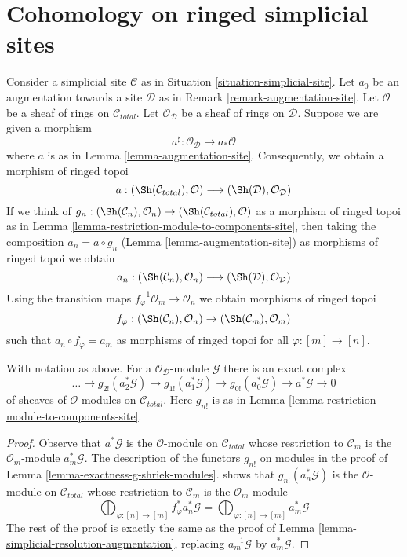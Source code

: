\section{Cohomology on ringed simplicial sites}
\label{section-cohomology-simplicial-sites-modules}

\noindent
Consider a simplicial site $\mathcal{C}$ as in
Situation \ref{situation-simplicial-site}.
Let $a_0$ be an augmentation towards a site $\mathcal{D}$ as in
Remark \ref{remark-augmentation-site}.
Let $\mathcal{O}$ be a sheaf of rings on $\mathcal{C}_{total}$.
Let $\mathcal{O}_\mathcal{D}$ be a sheaf of rings on $\mathcal{D}$.
Suppose we are given a morphism
$$
a^\sharp : \mathcal{O}_\mathcal{D} \longrightarrow a_*\mathcal{O}
$$
where $a$ is as in Lemma \ref{lemma-augmentation-site}.
Consequently, we obtain a morphism of ringed topoi
$$
a :
(\Sh(\mathcal{C}_{total}), \mathcal{O})
\longrightarrow
(\Sh(\mathcal{D}), \mathcal{O}_\mathcal{D})
$$
If we think of $g_n : (\Sh(\mathcal{C}_n), \mathcal{O}_n) \to
(\Sh(\mathcal{C}_{total}), \mathcal{O})$ as a morphism of ringed topoi
as in
Lemma \ref{lemma-restriction-module-to-components-site}, then
taking the composition $a_n = a \circ g_n$
(Lemma \ref{lemma-augmentation-site})
as morphisms of ringed topoi we obtain
$$
a_n :
(\Sh(\mathcal{C}_n), \mathcal{O}_n)
\longrightarrow
(\Sh(\mathcal{D}), \mathcal{O}_\mathcal{D})
$$
Using the transition maps $f_\varphi^{-1}\mathcal{O}_m \to \mathcal{O}_n$
we obtain morphisms of ringed topoi
$$
f_\varphi : (\Sh(\mathcal{C}_n), \mathcal{O}_n) \to
(\Sh(\mathcal{C}_m), \mathcal{O}_m)
$$
such that $a_n \circ f_\varphi = a_m$ as morphisms of
ringed topoi for all $\varphi : [m] \to [n]$.

\begin{lemma}
\label{lemma-simplicial-resolution-augmentation-modules}
With notation as above. For a $\mathcal{O}_\mathcal{D}$-module $\mathcal{G}$
there is an exact complex
$$
\ldots \to
g_{2!}(a_2^*\mathcal{G}) \to
g_{1!}(a_1^*\mathcal{G}) \to
g_{0!}(a_0^*\mathcal{G}) \to
a^*\mathcal{G} \to 0
$$
of sheaves of $\mathcal{O}$-modules on $\mathcal{C}_{total}$.
Here $g_{n!}$ is as in Lemma \ref{lemma-restriction-module-to-components-site}.
\end{lemma}

\begin{proof}
Observe that $a^*\mathcal{G}$ is the $\mathcal{O}$-module on
$\mathcal{C}_{total}$ whose restriction to $\mathcal{C}_m$
is the $\mathcal{O}_m$-module $a_m^*\mathcal{G}$.
The description of the functors $g_{n!}$ on modules
in the proof of Lemma \ref{lemma-exactness-g-shriek-modules}.
shows that $g_{n!}(a_n^*\mathcal{G})$ is the
$\mathcal{O}$-module on $\mathcal{C}_{total}$
whose restriction to $\mathcal{C}_m$ is the $\mathcal{O}_m$-module
$$
\bigoplus\nolimits_{\varphi : [n] \to [m]} f_\varphi^*a_n^*\mathcal{G} =
\bigoplus\nolimits_{\varphi : [n] \to [m]} a_m^*\mathcal{G}
$$
The rest of the proof is exactly the same as the proof of
Lemma \ref{lemma-simplicial-resolution-augmentation},
replacing $a_m^{-1}\mathcal{G}$ by $a_m^*\mathcal{G}$.
\end{proof}

